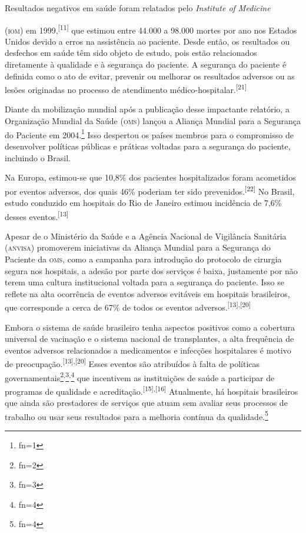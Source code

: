 \documentclass{article}
\makeatletter
\newcommand{\fn}{\afterassignment\fn@aux\count0=}
\newcommand{\fn@aux}{\csname fn\the\count0\endcsname}
\makeatother
\begin{document}
Resultados negativos em saúde foram relatados pelo \textit{Institute of
Medicine}

(\textsc{iom}) em 1999,\textsuperscript{[}\textsuperscript{11}\textsuperscript{]}
que estimou entre 44.000 a 98.000 mortes por ano nos Estados Unidos devido a
erros
na assistência ao paciente. Desde então, os resultados ou desfechos em saúde têm
sido objeto
de estudo, pois estão relacionados diretamente à qualidade e à segurança do
paciente. A
segurança do paciente é definida como o ato de evitar, prevenir ou melhorar os
resultados
adversos ou as lesões originadas no processo de atendimento médico-hospitalar.\textsuperscript{[}\textsuperscript{21}\textsuperscript{]}

Diante da mobilização mundial após a publicação desse impactante relatório, a
Organização
Mundial da Saúde (\textsc{oms}) lançou a Aliança Mundial para a Segurança do Paciente em
2004.\footnote{\fn1}
Isso despertou os países membros para o compromisso de desenvolver políticas
públicas e práticas voltadas para a segurança do paciente, incluindo o Brasil.

Na Europa, estimou-se que 10,8\% dos pacientes hospitalizados foram acometidos
por eventos
adversos, dos quais 46\% poderiam ter sido prevenidos.\textsuperscript{[}\textsuperscript{22}\textsuperscript{]}
No Brasil, estudo conduzido em hospitais do Rio de Janeiro estimou incidência de
7,6\% desses eventos.\textsuperscript{[}\textsuperscript{13}\textsuperscript{]}

Apesar de o Ministério da Saúde e a Agência Nacional de Vigilância Sanitária
(\textsc{anvisa})
promoverem iniciativas da Aliança Mundial para a Segurança do Paciente da \textsc{oms},
como a
campanha para introdução do protocolo de cirurgia segura nos hospitais, a adesão
por parte
dos serviços é baixa, justamente por não terem uma cultura institucional voltada
para a
segurança do paciente. Isso se reflete na alta ocorrência de eventos adversos
evitáveis em
hospitais brasileiros, que corresponde a cerca de 67\% de todos os eventos
adversos.\textsuperscript{[}\textsuperscript{13}\textsuperscript{]}\textsuperscript{,}\textsuperscript{[}\textsuperscript{20}\textsuperscript{]}

Embora o sistema de saúde brasileiro tenha aspectos positivos como a cobertura
universal de
vacinação e o sistema nacional de transplantes, a alta frequência de eventos
adversos
relacionados a medicamentos e infecções hospitalares é motivo de preocupação.\textsuperscript{[}\textsuperscript{13}\textsuperscript{]}\textsuperscript{,}\textsuperscript{[}\textsuperscript{20}\textsuperscript{]}
Esses eventos são atribuídos à falta de políticas governamentais\footnote{\fn2}\textsuperscript{,}\footnote{\fn3}\textsuperscript{,}\footnote{\fn4}
que incentivem as instituições de saúde a participar de programas de qualidade e
acreditação.\textsuperscript{[}\textsuperscript{15}\textsuperscript{]}\textsuperscript{,}\textsuperscript{[}\textsuperscript{16}\textsuperscript{]}
Atualmente, há hospitais brasileiros que ainda são prestadores de serviços que
atuam
sem avaliar seus processos de trabalho ou usar seus resultados para a melhoria
contínua da
qualidade.\footnote{\fn4}
\end{document}
